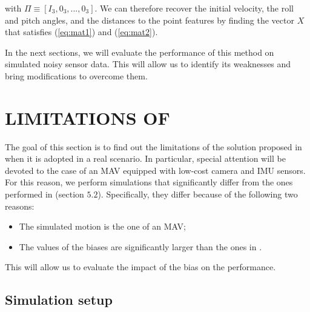 \documentclass[letterpaper, 10 pt, journal, twoside]{IEEEtran}  %
\begin{document}
\noindent with $\Pi \equiv [I_3, 0_3, ..., 0_3]$. We can therefore recover the initial velocity, the roll and pitch angles, and the distances to the point features
by finding the vector $X$ that satisfies (\ref{eq:mat1}) and (\ref{eq:mat2}).

In the next sections, we will evaluate the performance of this method on simulated noisy sensor data.
This will allow us to identify its weaknesses and bring modifications to overcome them.





\section{LIMITATIONS OF \cite{Martinelli2014}}\label{SectionBottlenecks}

The goal of this section is to find out the limitations of the solution proposed in \cite{Martinelli2014} when it is adopted in a real scenario. In particular, special attention will be devoted to the case of an MAV equipped with low-cost camera and IMU sensors. For this reason, we perform simulations that significantly differ from the ones performed in \cite{Martinelli2014} (section $5.2$). Specifically, they differ because of the following two reasons:
\begin{itemize}
\item The simulated motion is the one of an MAV;
\item The values of the biases are significantly larger than the ones in \cite{Martinelli2014}.
\end{itemize}
This will allow us to evaluate the impact of the bias on the performance.

\subsection{Simulation setup}\label{SubsectionConsidered}
\end{document}
